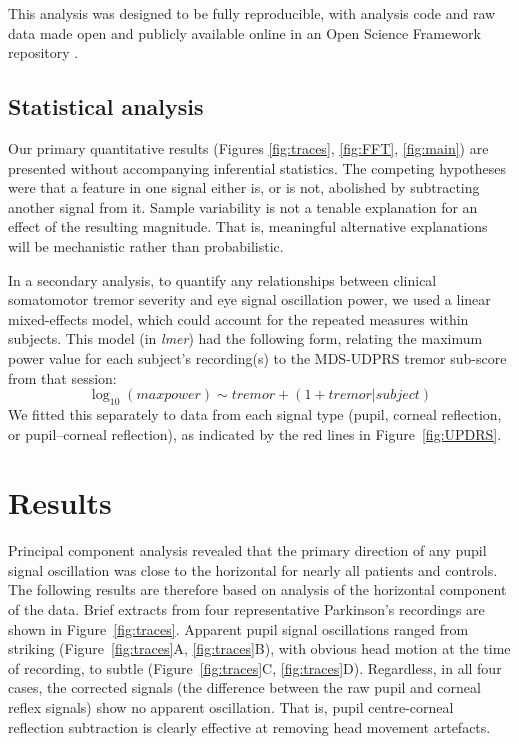 \documentclass[jou,a4paper]{apa6}
\begin{document}
This analysis was designed to be fully reproducible, with analysis code and raw data made open and publicly available online in an Open Science Framework repository \citep{Myall2016Investigating-o}.

\subsection{Statistical analysis}
Our primary quantitative results (Figures \ref{fig:traces}, \ref{fig:FFT}, \ref{fig:main}) are presented without accompanying inferential statistics. The competing hypotheses were that a feature in one signal either is, or is not, abolished by subtracting another signal from it. Sample variability is not a tenable explanation for an effect of the resulting magnitude. That is, meaningful alternative explanations will be mechanistic rather than probabilistic.

In a secondary analysis, to quantify any relationships between clinical somatomotor tremor severity and eye signal oscillation power, we used a linear mixed-effects model, which could account for the repeated measures within subjects. This model (in \textit{lmer}) had the following form, relating the maximum power value for each subject's recording(s) to the MDS-UDPRS tremor sub-score from that session: 
\begin{equation}\label{eq:model}
\log_{10} (max power) \sim tremor + (1 + tremor | subject)
\end{equation}
We fitted this separately to data from each signal type (pupil, corneal reflection, or pupil--corneal reflection), as indicated by the red lines in Figure~\ref{fig:UPDRS}.

\section{Results}
Principal component analysis revealed that the primary direction of any pupil signal oscillation was close to the horizontal for nearly all patients and controls. The following results are therefore based on analysis of the horizontal component of the data. Brief extracts from four representative Parkinson's recordings are shown in Figure~\ref{fig:traces}. Apparent pupil signal oscillations ranged from striking (Figure~\ref{fig:traces}A, \ref{fig:traces}B), with obvious head motion at the time of recording, to subtle (Figure~\ref{fig:traces}C, \ref{fig:traces}D). Regardless, in all four cases, the corrected signals (the difference between the raw pupil and corneal reflex signals) show no apparent oscillation. That is, pupil centre-corneal reflection subtraction is clearly effective at removing head movement artefacts.
\end{document}
